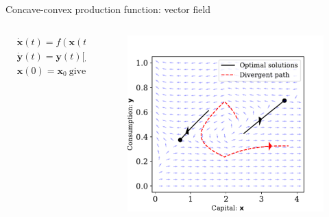 \documentclass[aspectratio=169,10pt]{beamer}
\begin{document}
\begin{frame}{Concave-convex production function: vector field}
	\begin{columns}
		\begin{column}{0.5\textwidth}
			\begin{align*}
				&\dot{\mathbf{x}}(t) = f(\mathbf{x}(t)) - \mathbf{y}(t)-\delta \mathbf{x}(t)\\
				&\dot{\mathbf{y}}(t) = \mathbf{y}(t)\big[f'(\mathbf{x}(t)) -\delta -r\big]\\
				& \mathbf{x}(0) = \mathbf{x}_0 ~ \text{given}.
			\end{align*}
		\end{column}
		\begin{column}{0.5\textwidth}
			\begin{figure}[t!]
				\centering
				\includegraphics[width=\textwidth]{figs/vec_field_con_con.pdf}
				\vspace{-4mm}
			\end{figure}
		\end{column}
	\end{columns}
\end{frame}
\end{document}
